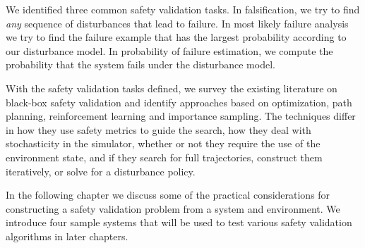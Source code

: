 We identified three common safety validation tasks. In falsification, we try to find \emph{any} sequence of disturbances that lead to failure. In most likely failure analysis we try to find the failure example that has the largest probability according to our disturbance model. In probability of failure estimation, we compute the probability that the system fails under the disturbance model. 

With the safety validation tasks defined, we survey the existing literature on black-box safety validation and identify approaches based on optimization, path planning, reinforcement learning and importance sampling. The techniques differ in how they use safety metrics to guide the search, how they deal with stochasticity in the simulator, whether or not they require the use of the environment state, and if they search for full trajectories, construct them iteratively, or solve for a disturbance policy. 

In the following chapter we discuss some of the practical considerations for constructing a safety validation problem from a system and environment. We introduce four sample systems that will be used to test various safety validation algorithms in later chapters. 